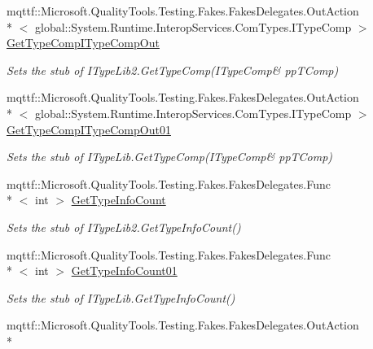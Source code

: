 \begin{DoxyCompactItemize}
mqttf\-::\-Microsoft.\-Quality\-Tools.\-Testing.\-Fakes.\-Fakes\-Delegates.\-Out\-Action\\*
$<$ global\-::\-System.\-Runtime.\-Interop\-Services.\-Com\-Types.\-I\-Type\-Comp $>$ \hyperlink{class_system_1_1_runtime_1_1_interop_services_1_1_com_types_1_1_fakes_1_1_stub_i_type_lib2_a0fb22c311adafff89de3c085499c76dd}{Get\-Type\-Comp\-I\-Type\-Comp\-Out}
\begin{DoxyCompactList}\small\item\em Sets the stub of I\-Type\-Lib2.\-Get\-Type\-Comp(I\-Type\-Comp\& pp\-T\-Comp)\end{DoxyCompactList}\item 
mqttf\-::\-Microsoft.\-Quality\-Tools.\-Testing.\-Fakes.\-Fakes\-Delegates.\-Out\-Action\\*
$<$ global\-::\-System.\-Runtime.\-Interop\-Services.\-Com\-Types.\-I\-Type\-Comp $>$ \hyperlink{class_system_1_1_runtime_1_1_interop_services_1_1_com_types_1_1_fakes_1_1_stub_i_type_lib2_a9aed2c9872fd7d8eaa55c04a99b35c4d}{Get\-Type\-Comp\-I\-Type\-Comp\-Out01}
\begin{DoxyCompactList}\small\item\em Sets the stub of I\-Type\-Lib.\-Get\-Type\-Comp(I\-Type\-Comp\& pp\-T\-Comp)\end{DoxyCompactList}\item 
mqttf\-::\-Microsoft.\-Quality\-Tools.\-Testing.\-Fakes.\-Fakes\-Delegates.\-Func\\*
$<$ int $>$ \hyperlink{class_system_1_1_runtime_1_1_interop_services_1_1_com_types_1_1_fakes_1_1_stub_i_type_lib2_ac944dc7d2acce2453e1209744b1cf07b}{Get\-Type\-Info\-Count}
\begin{DoxyCompactList}\small\item\em Sets the stub of I\-Type\-Lib2.\-Get\-Type\-Info\-Count()\end{DoxyCompactList}\item 
mqttf\-::\-Microsoft.\-Quality\-Tools.\-Testing.\-Fakes.\-Fakes\-Delegates.\-Func\\*
$<$ int $>$ \hyperlink{class_system_1_1_runtime_1_1_interop_services_1_1_com_types_1_1_fakes_1_1_stub_i_type_lib2_a5d332668107e8602b0138dc1eaceccba}{Get\-Type\-Info\-Count01}
\begin{DoxyCompactList}\small\item\em Sets the stub of I\-Type\-Lib.\-Get\-Type\-Info\-Count()\end{DoxyCompactList}\item 
mqttf\-::\-Microsoft.\-Quality\-Tools.\-Testing.\-Fakes.\-Fakes\-Delegates.\-Out\-Action\\*

\end{DoxyCompactItemize}
